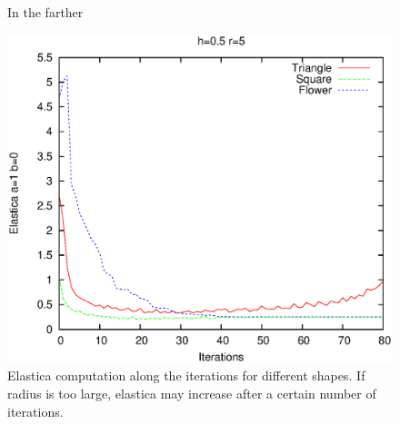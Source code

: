 \documentclass[runningheads]{llncs}
\begin{document}
\begin{figure}[!ht]
{		\hspace{15pt}
		}				
		
		
\label{fig:mx-flow-gs-radius-effect}
\caption{In the farther}
\end{figure}

\begin{figure}[!ht]
\center
\includegraphics[scale=0.5]{images/flow/elastica-energy-plot/r5h05.eps}
\caption{Elastica computation along the iterations for different shapes. If radius is too large, elastica may increase after a certain number of iterations. }
\label{fig:mx-elastica-plots}
\end{figure}
\end{document}

